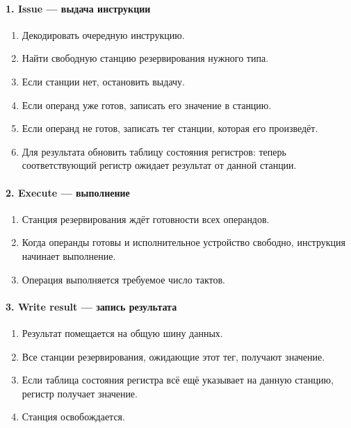 \documentclass[12pt,a4paper]{article}
\begin{document}
\paragraph{1. Issue --- выдача инструкции}

\begin{enumerate}
    \item Декодировать очередную инструкцию.
    \item Найти свободную станцию резервирования нужного типа.
    \item Если станции нет, остановить выдачу.
    \item Если операнд уже готов, записать его значение в станцию.
    \item Если операнд не готов, записать тег станции, которая его произведёт.
    \item Для результата обновить таблицу состояния регистров: теперь соответствующий регистр ожидает результат от данной станции.
\end{enumerate}

\paragraph{2. Execute --- выполнение}

\begin{enumerate}
    \item Станция резервирования ждёт готовности всех операндов.
    \item Когда операнды готовы и исполнительное устройство свободно, инструкция начинает выполнение.
    \item Операция выполняется требуемое число тактов.
\end{enumerate}

\paragraph{3. Write result --- запись результата}

\begin{enumerate}
    \item Результат помещается на общую шину данных.
    \item Все станции резервирования, ожидающие этот тег, получают значение.
    \item Если таблица состояния регистра всё ещё указывает на данную станцию, регистр получает значение.
    \item Станция освобождается.
\end{enumerate}
\end{document}

